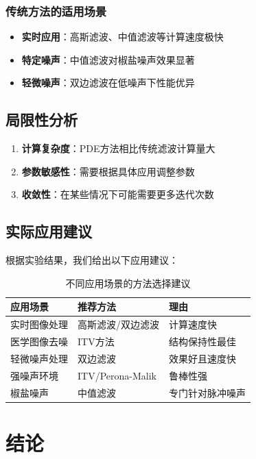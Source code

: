 \documentclass[a4paper,12pt]{ctexart}
\begin{document}
\subsubsection{传统方法的适用场景}
\begin{itemize}
    \item \textbf{实时应用}：高斯滤波、中值滤波等计算速度极快
    \item \textbf{特定噪声}：中值滤波对椒盐噪声效果显著
    \item \textbf{轻微噪声}：双边滤波在低噪声下性能优异
\end{itemize}

\subsection{局限性分析}

\begin{enumerate}
    \item \textbf{计算复杂度}：PDE方法相比传统滤波计算量大
    \item \textbf{参数敏感性}：需要根据具体应用调整参数
    \item \textbf{收敛性}：在某些情况下可能需要更多迭代次数
\end{enumerate}

\subsection{实际应用建议}

根据实验结果，我们给出以下应用建议：

\begin{table}[H]
\centering
\caption{不同应用场景的方法选择建议}
\begin{tabular}{|l|l|l|}
\hline
\textbf{应用场景} & \textbf{推荐方法} & \textbf{理由} \\
\hline
实时图像处理 & 高斯滤波/双边滤波 & 计算速度快 \\
\hline
医学图像去噪 & ITV方法 & 结构保持性最佳 \\
\hline
轻微噪声处理 & 双边滤波 & 效果好且速度快 \\
\hline
强噪声环境 & ITV/Perona-Malik & 鲁棒性强 \\
\hline
椒盐噪声 & 中值滤波 & 专门针对脉冲噪声 \\
\hline
\end{tabular}
\end{table}

\section{结论}
\end{document}
